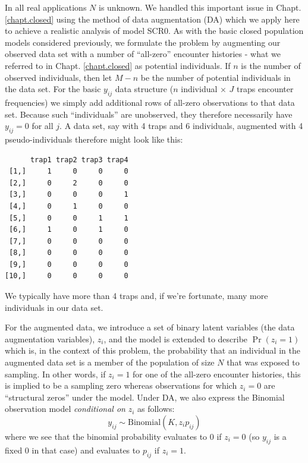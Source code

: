 In all real applications $N$ is unknown.
 We handled this
important issue in Chapt. \ref{chapt.closed} using the method of data augmentation
(DA) which we apply here to achieve a realistic analysis of model SCR0. As
with the basic closed population models considered previously, we
formulate the problem  by augmenting our observed data set with a
number of ``all-zero'' encounter histories - what we referred to in
Chapt. \ref{chapt.closed} as potential individuals. If $n$ is the number of observed
individuals, then let $M-n$ be the number of potential individuals in
the data set. For the basic $y_{ij}$ data structure ($n$ individual $\times$
$J$ traps encounter frequencies) we simply add additional rows of all-zero
observations to that data set. Because such
``individuals'' are unobserved, they  therefore necessarily have
$y_{ij}=0$ for all $j$.  A data set, say with 4 traps and 6 individuals,
augmented with 4 pseudo-individuals therefore might look like this:
{\small
\begin{verbatim}
      trap1 trap2 trap3 trap4
 [1,]     1     0     0     0
 [2,]     0     2     0     0
 [3,]     0     0     0     1
 [4,]     0     1     0     0
 [5,]     0     0     1     1
 [6,]     1     0     1     0
 [7,]     0     0     0     0
 [8,]     0     0     0     0
 [9,]     0     0     0     0
[10,]     0     0     0     0
\end{verbatim}
}
We typically have more than 4 traps and, if we're fortunate, many more
individuals in our data set.

For the augmented data, we introduce a set of binary latent variables
(the data augmentation variables), $z_{i}$, and the model is extended
to describe $\Pr(z_{i} = 1)$ which is, in the context of this problem,
the probability that an individual in the augmented data set is a
member of the population of size $N$  that was exposed to sampling. In other words, if $z_{i}=1$
for one of the all-zero encounter histories, this is implied to be
a sampling zero whereas observations for which $z_{i}=0$ are
``structural zeros'' under the model.  Under DA, we also express the
Binomial observation model {\it conditional on} $z_{i}$ as follows:
\[
	y_{ij} \sim \mbox{Binomial}(K, z_{i} p_{ij})
\]
where we see that the binomial probability evaluates to 0 if $z_{i}=0$
(so $y_{ij}$ is a fixed 0 in that case)
and evaluates to $p_{ij}$ if $z_{i} = 1$.

